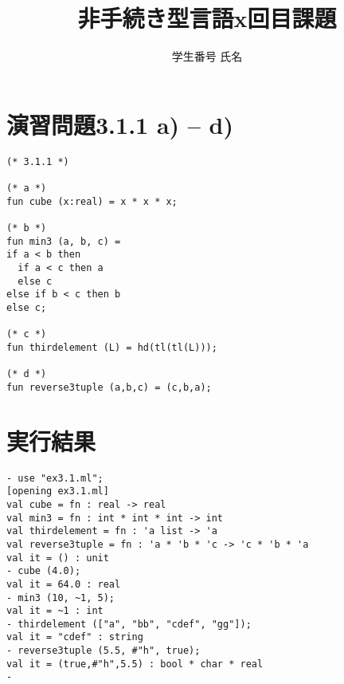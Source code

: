 \documentclass{article}
\begin{document}
\title{非手続き型言語x回目課題}
\author{学生番号 氏名}
\maketitle

\section{演習問題3.1.1 a) -- d)}

\begin{verbatim}
(* 3.1.1 *)

(* a *)
fun cube (x:real) = x * x * x;

(* b *)
fun min3 (a, b, c) =
if a < b then
  if a < c then a
  else c
else if b < c then b
else c;

(* c *)
fun thirdelement (L) = hd(tl(tl(L)));

(* d *)
fun reverse3tuple (a,b,c) = (c,b,a);

\end{verbatim}

\section{実行結果}

\begin{verbatim}
- use "ex3.1.ml";
[opening ex3.1.ml]
val cube = fn : real -> real
val min3 = fn : int * int * int -> int
val thirdelement = fn : 'a list -> 'a
val reverse3tuple = fn : 'a * 'b * 'c -> 'c * 'b * 'a
val it = () : unit
- cube (4.0);
val it = 64.0 : real
- min3 (10, ~1, 5);
val it = ~1 : int
- thirdelement (["a", "bb", "cdef", "gg"]);
val it = "cdef" : string
- reverse3tuple (5.5, #"h", true);
val it = (true,#"h",5.5) : bool * char * real
- 

\end{verbatim}
\end{document}
